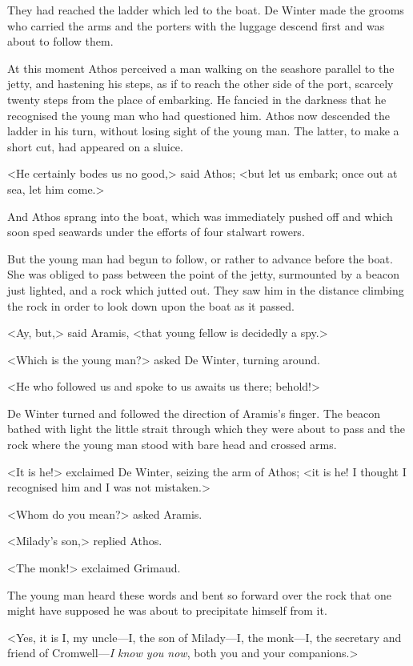 They had reached the ladder which led to the boat. De Winter made the grooms who carried the arms and the porters with the luggage descend first and was about to follow them.

At this moment Athos perceived a man walking on the seashore parallel to the jetty, and hastening his steps, as if to reach the other side of the port, scarcely twenty steps from the place of embarking. He fancied in the darkness that he recognised the young man who had questioned him. Athos now descended the ladder in his turn, without losing sight of the young man. The latter, to make a short cut, had appeared on a sluice.

<He certainly bodes us no good,> said Athos; <but let us embark; once out at sea, let him come.>

And Athos sprang into the boat, which was immediately pushed off and which soon sped seawards under the efforts of four stalwart rowers.

But the young man had begun to follow, or rather to advance before the boat. She was obliged to pass between the point of the jetty, surmounted by a beacon just lighted, and a rock which jutted out. They saw him in the distance climbing the rock in order to look down upon the boat as it passed.

<Ay, but,> said Aramis, <that young fellow is decidedly a spy.>

<Which is the young man?> asked De Winter, turning around.

<He who followed us and spoke to us awaits us there; behold!>

De Winter turned and followed the direction of Aramis's finger. The beacon bathed with light the little strait through which they were about to pass and the rock where the young man stood with bare head and crossed arms.

<It is he!> exclaimed De Winter, seizing the arm of Athos; <it is he! I thought I recognised him and I was not mistaken.>

<Whom do you mean?> asked Aramis.

<Milady's son,> replied Athos.

<The monk!> exclaimed Grimaud.

The young man heard these words and bent so forward over the rock that one might have supposed he was about to precipitate himself from it.

<Yes, it is I, my uncle—I, the son of Milady—I, the monk—I, the secretary and friend of Cromwell—\emph{I know you now}, both you and your companions.>

